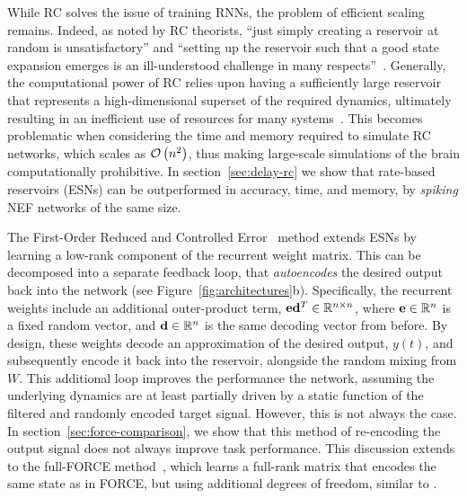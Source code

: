 While RC solves the issue of training RNNs, the problem of efficient scaling remains. 
Indeed, as noted by RC theorists, ``just simply creating a reservoir at random is unsatisfactory'' and ``setting up the reservoir such that a good state expansion emerges is an ill-understood challenge in many respects''~\citep{lukovsevicius2012reservoir}.
Generally, the computational power of RC relies upon having a sufficiently large reservoir that represents a high-dimensional superset of the required dynamics, ultimately resulting in an inefficient use of resources for many systems~\citep{wallace2013randomly}.
This becomes problematic when considering the time and memory required to simulate RC networks, which scales as $\mathcal{O}\left({ n^2 }\right)$, thus making large-scale simulations of the brain computationally prohibitive.
In section~\ref{sec:delay-rc} we show that rate-based reservoirs (ESNs) can be outperformed in accuracy, time, and memory, by \emph{spiking} NEF networks of the same size.

The First-Order Reduced and Controlled Error~\citep[FORCE;][]{sussillo2009generating} method extends ESNs by learning a low-rank component of the recurrent weight matrix.
This can be decomposed into a separate feedback loop, that \emph{autoencodes} the desired output back into the network (see Figure~\ref{fig:architectures}b).
Specifically, the recurrent weights include an additional outer-product term, $\mathbf{e} \mathbf{d}^T \in \mathbb{R}^{n \times n}$, where $\mathbf{e} \in \mathbb{R}^n$ is a fixed random vector, and $\mathbf{d} \in \mathbb{R}^n$ is the same decoding vector from before.
By design, these weights decode an approximation of the desired output, $y(t)$, and subsequently encode it back into the reservoir, alongside the random mixing from $W$.
This additional loop improves the performance the network, assuming the underlying dynamics are at least partially driven by a static function of the filtered and randomly encoded target signal.
However, this is not always the case.
In section~\ref{sec:force-comparison}, we show that this method of re-encoding the output signal does not always improve task performance.  %
This discussion extends to the full-FORCE method~\citep{depasquale2018full}, which learns a full-rank matrix that encodes the same state as in FORCE, but using additional degrees of freedom, similar to \citet{tripp2006neural}.

